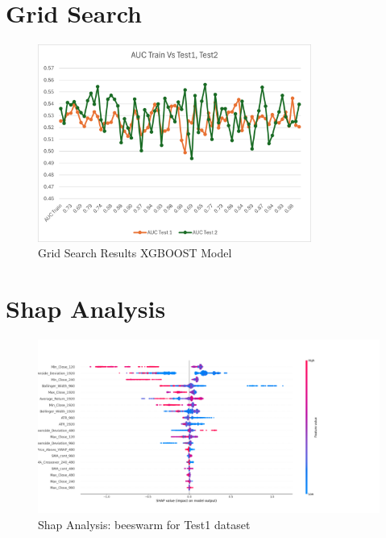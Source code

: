 \documentclass[11pt]{article}
\begin{document}
\section{Grid Search}
\begin{figure}[ht]
    \centering
    \includegraphics[width=0.8\textwidth]{AMZN_AUC_TRAIN_VS_TEST1_TEST2.png}
    \caption{Grid Search Results XGBOOST Model}
    \label{fig:grid_search_results}
\end{figure}
\newpage

\section{Shap Analysis}
\begin{figure}[ht]
    \centering
    \includegraphics[width=1.2\textwidth]{AMZN/shap_analysis_beeswarm.png}
    \caption{Shap Analysis: beeswarm for Test1 dataset}
    \label{fig:shap_analysis_beeswarm_1}
\end{figure}
\end{document}
